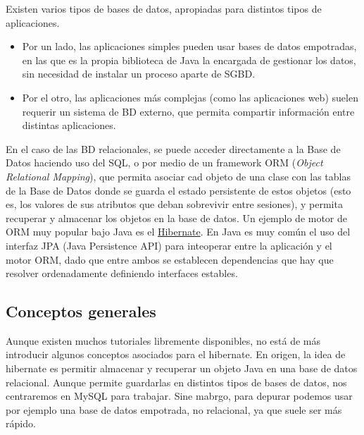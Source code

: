 \documentclass[11pt]{article}
\begin{document}
Existen varios tipos de bases de datos, apropiadas para distintos tipos de aplicaciones. 

\begin{itemize}

\item Por un lado, las aplicaciones simples pueden usar bases de
datos empotradas, en las que es la propia biblioteca de Java la encargada de
gestionar los datos, sin necesidad de instalar un proceso aparte de SGBD.

\item Por el otro, las aplicaciones más complejas (como las aplicaciones web) suelen requerir un sistema
de BD externo, que permita compartir información entre distintas aplicaciones.

\end{itemize}

En el caso de las BD relacionales, se puede acceder directamente a la Base de Datos
haciendo uso del SQL, o por medio de un framework ORM (\emph{Object Relational Mapping}), que permita asociar
cad objeto de una clase con las tablas de la Base de Datos donde se guarda el estado persistente de estos objetos (esto es, los valores de sus atributos que deban sobrevivir entre sesiones), y permita recuperar y almacenar los objetos en la base de datos. Un ejemplo de motor de ORM muy popular bajo Java es el
\href{http://hibernate.org}{Hibernate}. En Java es muy común el uso del interfaz JPA (Java Persistence API) para inteoperar entre la aplicación y el motor ORM, dado que entre ambos se establecen dependencias que hay que resolver ordenadamente definiendo interfaces estables.

\subsection{Conceptos generales}
\label{sec-6-1}


Aunque existen muchos tutoriales libremente disponibles, no está de más
introducir algunos conceptos asociados para el hibernate.
En origen, la idea de hibernate es permitir almacenar y recuperar un
objeto Java en una base de datos relacional. Aunque permite guardarlas en distintos
tipos de bases de datos, nos centraremos en MySQL para trabajar.
Sine mabrgo, para depurar podemos usar por ejemplo una base de datos empotrada, no relacional, ya que suele ser más rápido.
\end{document}
